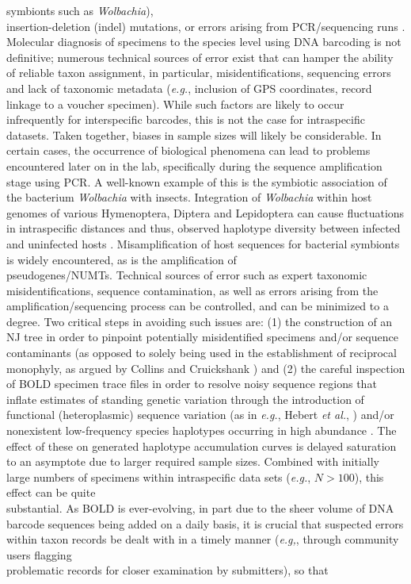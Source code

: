 symbionts such as \textit{Wolbachia}), \\ insertion-deletion (indel) mutations, or errors arising from PCR/sequencing runs \cite{goodall2012comparison}. \\ Molecular diagnosis of specimens to the species level using DNA barcoding is not \\ definitive; numerous technical sources of error exist that can hamper the ability of reliable taxon assignment, in particular, misidentifications, sequencing errors and lack of taxonomic metadata (\textit{e.g.}, inclusion of GPS coordinates, record linkage to a voucher specimen). While such factors are likely to occur infrequently for interspecific barcodes, this is not the case for intraspecific datasets. Taken together, biases in sample sizes  will likely be considerable. In certain cases, the occurrence of biological phenomena can lead to problems encountered later on in the lab, specifically during the sequence amplification stage using PCR. A well-known example of this is the symbiotic association of the bacterium \textit{Wolbachia} with insects. Integration of \textit{Wolbachia} within host genomes of various Hymenoptera, Diptera and Lepidoptera can cause fluctuations in intraspecific distances \cite{smith2012wolbachia} and thus, observed haplotype diversity between infected and uninfected hosts \cite{chen2017effects}. Misamplification of host sequences for bacterial symbionts is widely encountered, as is the amplification of \\ pseudogenes/NUMTs. Technical sources of error such as expert taxonomic \\ misidentifications, sequence contamination, as well as errors arising from the \\ amplification/sequencing process can be controlled, and can be minimized to a degree. Two critical steps in avoiding such issues are: (1) the construction of an NJ tree in order to pinpoint potentially misidentified specimens and/or sequence contaminants (as opposed to solely being used in the establishment of reciprocal monophyly, as argued by Collins and Cruickshank \cite{collins2013seven}) and (2) the careful inspection of BOLD specimen trace files in order to resolve noisy sequence regions that inflate estimates of standing genetic variation through the introduction of functional (heteroplasmic) sequence variation (as in \textit{e.g.}, Hebert \textit{et al.}, \cite{hebert2004ten}) and/or nonexistent low-frequency species haplotypes occurring in high abundance \cite{stoeckle2012frequency}. The effect of these on generated haplotype accumulation curves is delayed saturation to an asymptote due to larger required sample sizes. Combined with initially large numbers of specimens within intraspecific data sets (\textit{e.g.}, $N > 100$), this effect can be quite \\ substantial. As BOLD is ever-evolving, in part due to the sheer volume of DNA barcode sequences being added on a daily basis, it is crucial that suspected errors within taxon records be dealt with in a timely manner (\textit{e.g,}, through community users flagging \\ problematic records for closer examination by submitters), so that 